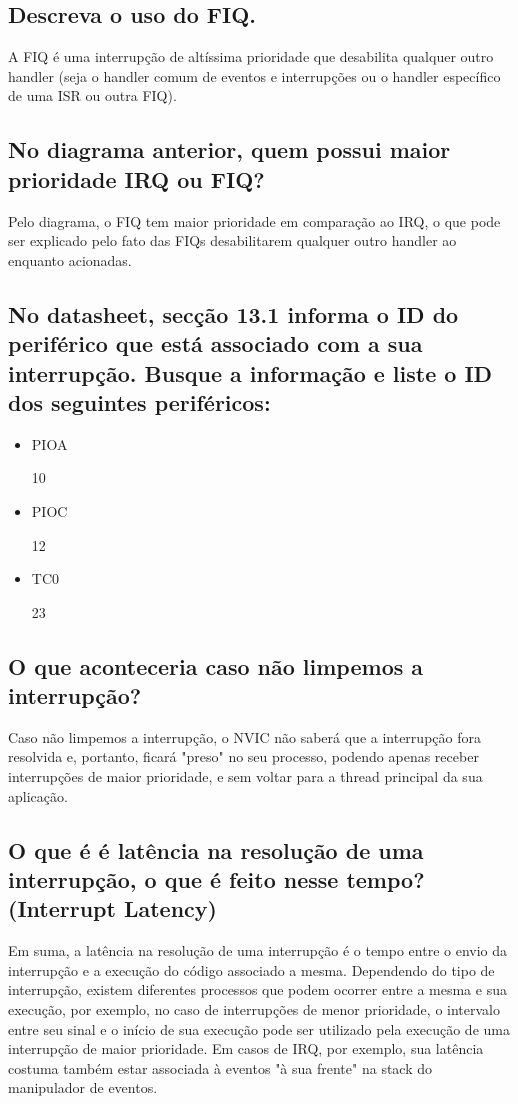 \documentclass[11pt]{article}
\begin{document}
\subsection{Descreva o uso do FIQ.}
\label{sec:orgheadline6}
A FIQ é uma interrupção de altíssima prioridade que desabilita qualquer outro
handler (seja o handler comum de eventos e interrupções ou o handler específico
de uma ISR ou outra FIQ).
\subsection{No diagrama anterior, quem possui maior prioridade IRQ ou FIQ?}
\label{sec:orgheadline7}
Pelo diagrama, o FIQ tem maior prioridade em comparação ao IRQ, o que pode ser
explicado pelo fato das FIQs desabilitarem qualquer outro handler ao enquanto
acionadas.
\subsection{No datasheet, secção 13.1 informa o ID do periférico que está associado com a sua interrupção. Busque a informação e liste o ID dos seguintes periféricos:}
\label{sec:orgheadline8}
\begin{itemize}
\item PIOA

10

\item PIOC

12

\item TC0

23
\end{itemize}

\subsection{O que aconteceria caso não limpemos a interrupção?}
\label{sec:orgheadline9}
Caso não limpemos a interrupção, o NVIC não saberá que a interrupção fora
resolvida e, portanto, ficará "preso" no seu processo, podendo apenas receber
interrupções de maior prioridade, e sem voltar para a thread principal da sua
aplicação.
\subsection{O que é é latência na resolução de uma interrupção, o que é feito nesse tempo? (Interrupt Latency)}
\label{sec:orgheadline10}
Em suma, a latência na resolução de uma interrupção é o tempo entre o envio da
interrupção e a execução do código associado a mesma. Dependendo do tipo de
interrupção, existem diferentes processos que podem ocorrer entre a mesma e
sua execução, por exemplo, no caso de interrupções de menor prioridade, o
intervalo entre seu sinal e o início de sua execução pode ser utilizado pela
execução de uma interrupção de maior prioridade. Em casos de IRQ, por exemplo,
sua latência costuma também estar associada à eventos "à sua frente" na stack
do manipulador de eventos.
\end{document}
